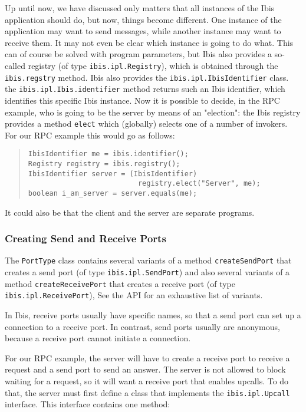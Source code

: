 \documentclass[10pt]{article}
\begin{document}
Up until now, we have discussed only matters that all instances of
the Ibis application should do, but now, things become different.
One instance of the application may want to send messages, while
another instance may want to receive them.
It may not even be clear which instance is going to do what.
This can of course be solved with program parameters, but Ibis
also provides a so-called registry (of type
\verb+ibis.ipl.Registry+), which is obtained through the
\verb+ibis.regstry+ method.
Ibis also provides the \verb+ibis.ipl.IbisIdentifier+ class.
the \verb+ibis.ipl.Ibis.identifier+ method returns such an
Ibis identifier, which identifies this specific Ibis instance.
Now it is possible to decide, in the RPC example, who is going
to be the server by means of an "election": the Ibis registry
provides a method \verb+elect+ which (globally) selects one of
a number of invokers.
For our RPC example this would go as follows:

\begin{quote}
\begin{verbatim}
IbisIdentifier me = ibis.identifier();
Registry registry = ibis.registry();
IbisIdentifier server = (IbisIdentifier)
                          registry.elect("Server", me);
boolean i_am_server = server.equals(me);
\end{verbatim}
\end{quote}

It could also be that the client and the server are separate programs.

\subsubsection{Creating Send and Receive Ports}

The \verb+PortType+ class contains several variants of a method
\verb+createSendPort+ that creates a send port (of type
\verb+ibis.ipl.SendPort+) and
also several variants of a method \verb+createReceivePort+ that
creates a receive port (of type \verb+ibis.ipl.ReceivePort+),
See the API for an exhaustive list of variants.

In Ibis, receive ports usually have specific names, so that
a send port can set up a connection to a receive port. In contrast,
send ports usually are anonymous, because a receive port cannot
initiate a connection.

For our RPC example, the server will have to create a receive port
to receive a request and a send port to send an answer.
The server is not allowed to block waiting for a request, so it will
want a receive port that enables upcalls.
To do that, the server must first define a class that implements
the \verb+ibis.ipl.Upcall+ interface. This interface contains one
method:
\end{document}
